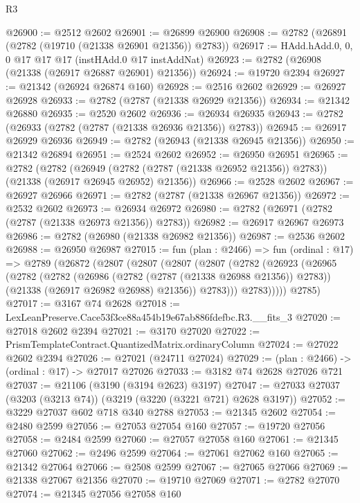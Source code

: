 \begin{lexlean}{R3}
\begin{coremodule}
@26900 := @2512 @2602
@26901 := @26899 @26900
@26908 := @2782 (@26891 (@2782 (@19710 (@21338 @26901 @21356)) @2783))
@26917 := HAdd.hAdd.{0, 0, 0} @17 @17 @17 (instHAdd.{0} @17 instAddNat)
@26923 := @2782 (@26908 (@21338 (@26917 @26887 @26901) @21356))
@26924 := @19720 @2394
@26927 := @21342 (@26924 @26874 @160)
@26928 := @2516 @2602
@26929 := @26927 @26928
@26933 := @2782 (@2787 (@21338 @26929 @21356))
@26934 := @21342 @26880
@26935 := @2520 @2602
@26936 := @26934 @26935
@26943 := @2782 (@26933 (@2782 (@2787 (@21338 @26936 @21356)) @2783))
@26945 := @26917 @26929 @26936
@26949 := @2782 (@26943 (@21338 @26945 @21356))
@26950 := @21342 @26894
@26951 := @2524 @2602
@26952 := @26950 @26951
@26965 := @2782
    (@2782
      (@26949 (@2782 (@2787 (@21338 @26952 @21356)) @2783))
      (@21338 (@26917 @26945 @26952) @21356))
@26966 := @2528 @2602
@26967 := @26927 @26966
@26971 := @2782 (@2787 (@21338 @26967 @21356))
@26972 := @2532 @2602
@26973 := @26934 @26972
@26980 := @2782 (@26971 (@2782 (@2787 (@21338 @26973 @21356)) @2783))
@26982 := @26917 @26967 @26973
@26986 := @2782 (@26980 (@21338 @26982 @21356))
@26987 := @2536 @2602
@26988 := @26950 @26987
@27015 := fun (plan : @2466) =>
  fun (ordinal : @17) =>
  @2789
    (@26872
      (@2807
        (@2807
          (@2807
            (@2807
              (@2782
                (@26923
                  (@26965
                    (@2782
                      (@2782
                        (@26986 (@2782 (@2787 (@21338 @26988 @21356)) @2783))
                        (@21338 (@26917 @26982 @26988) @21356))
                      @2783)))
                @2783)))))
      @2785)
@27017 := @3167 @74 @2628
@27018 := LexLeanPreserve.Cace53f3ce88a454b19e67ab886fdefbc.R3.__fits_3
@27020 := @27018 @2602 @2394
@27021 := @3170 @27020
@27022 := PrismTemplateContract.QuantizedMatrix.ordinaryColumn
@27024 := @27022 @2602 @2394
@27026 := @27021 (@24711 @27024)
@27029 := (plan : @2466) -> (ordinal : @17) -> @27017 @27026
@27033 := @3182 @74 @2628 @27026 @721
@27037 := @21106 (@3190 (@3194 @2623) @3197)
@27047 := @27033 @27037 (@3203 (@3213 @74)) (@3219 (@3220 (@3221 @721) @2628 @3197))
@27052 := @3229 @27037 @602 @718 @340 @2788
@27053 := @21345 @2602
@27054 := @2480 @2599
@27056 := @27053 @27054 @160
@27057 := @19720 @27056
@27058 := @2484 @2599
@27060 := @27057 @27058 @160
@27061 := @21345 @27060
@27062 := @2496 @2599
@27064 := @27061 @27062 @160
@27065 := @21342 @27064
@27066 := @2508 @2599
@27067 := @27065 @27066
@27069 := @21338 @27067 @21356
@27070 := @19710 @27069
@27071 := @2782 @27070
@27074 := @21345 @27056 @27058 @160

\end{coremodule}
\end{lexlean}
